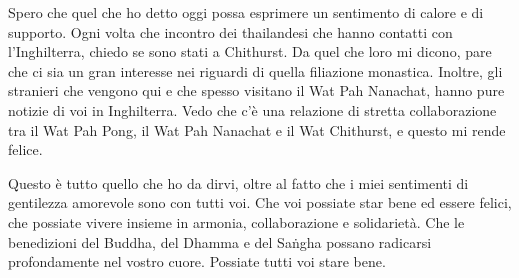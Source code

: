 Spero che quel che ho detto oggi possa esprimere un sentimento di calore
e di supporto. Ogni volta che incontro dei thailandesi che hanno
contatti con l'Inghilterra, chiedo se sono stati a Chithurst. Da quel
che loro mi dicono, pare che ci sia un gran interesse nei riguardi di
quella filiazione monastica. Inoltre, gli stranieri che vengono qui e
che spesso visitano il Wat Pah Nanachat, hanno pure notizie di voi in
Inghilterra. Vedo che c'è una relazione di stretta collaborazione tra il
Wat Pah Pong, il Wat Pah Nanachat e il Wat Chithurst, e questo mi rende
felice.

Questo è tutto quello che ho da dirvi, oltre al fatto che i miei
sentimenti di gentilezza amorevole sono con tutti voi. Che voi possiate
star bene ed essere felici, che possiate vivere insieme in armonia,
collaborazione e solidarietà. Che le benedizioni del Buddha, del Dhamma
e del Saṅgha possano radicarsi profondamente nel vostro cuore. Possiate
tutti voi stare bene.

